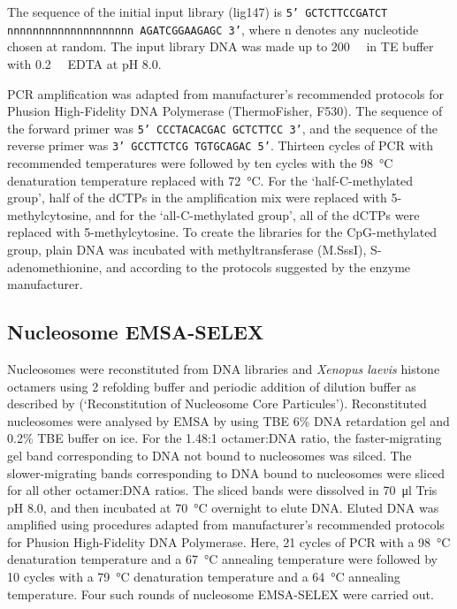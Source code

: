 \documentclass[parskip=full, numbers=noenddot]{scrreprt}
\begin{document}
The sequence of the initial input library (lig147) is \texttt{5' GCTCTTCCGATCT nnnnnnnnn\-nnnnnnnnnnn AGATCGGAAGAGC 3'}, where n denotes any nucleotide chosen at random. The input library DNA was made up to \SI{200}{\nano\Molar} in TE buffer with \SI{0.2}{\milli\Molar} EDTA at pH 8.0.

PCR amplification was adapted from manufacturer's recommended protocols for Phusion High-Fidelity DNA Polymerase (ThermoFisher, F530).  The sequence of the forward primer was \texttt{5' CCCTACACGAC GCTCTTCC 3'}, and the sequence of the reverse primer was \texttt{3' GCCTTCTCG TGTGCAGAC 5'}.  Thirteen cycles of PCR with recommended temperatures were followed by ten cycles with the \SI{98}{\celsius} denaturation temperature replaced with \SI{72}{\celsius}.  For the `half-C-methylated group', half of the dCTPs in the amplification mix were replaced with 5-methylcytosine, and for the `all-C-methylated group', all of the dCTPs were replaced with 5-methylcytosine.  To create the libraries for the CpG-methylated group, plain DNA was incubated with methyltransferase (M.SssI), S-adenomethionine, and  according to the protocols suggested by the enzyme manufacturer.

\subsection{Nucleosome EMSA-SELEX}
\label{ssec:emsaselex_methods_selex}

Nucleosomes were reconstituted from DNA libraries and \emph{Xenopus laevis} histone octamers using \SI{2}{\Molar}  refolding buffer and periodic addition of dilution buffer as described by \citet{dyer_reconstitution_2003} (`Reconstitution of Nucleosome Core Particules').  Reconstituted nucleosomes were analysed by EMSA by using TBE 6\% DNA retardation gel and 0.2\% TBE buffer on ice.  For the 1.48:1 octamer:DNA ratio, the faster-migrating gel band corresponding to DNA not bound to nucleosomes was silced.  The slower-migrating bands corresponding to DNA bound to nucleosomes were sliced for all other octamer:DNA ratios.  The sliced bands were dissolved in \SI{70}{\micro\litre} Tris pH 8.0, and then incubated at \SI{70}{\celsius} overnight to elute DNA.  Eluted DNA was amplified using procedures adapted from manufacturer's recommended protocols for Phusion High-Fidelity DNA Polymerase.  Here, 21 cycles of PCR with a \SI{98}{\celsius} denaturation temperature and a \SI{67}{\celsius} annealing temperature were followed by 10 cycles with a \SI{79}{\celsius} denaturation temperature and a \SI{64}{\celsius} annealing temperature.  Four such rounds of nucleosome EMSA-SELEX were carried out.
\end{document}
